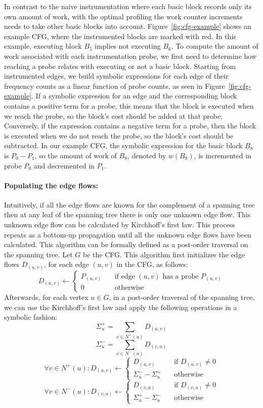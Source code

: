 In contrast to the naive instrumentation where each basic block records only its own amount of work, with the optimal profiling the work
counter increments needs to take other basic blocks into account. Figure~\ref{fig:cfg-example} shows an example CFG, where the instrumented
blocks are marked with red. In this example, executing block $B_5$ implies not executing $B_6$. To compute the amount of work associated
with each instrumentation probe, we first need to determine how reaching a probe relates with executing or not a basic block. Starting from
instrumented edges, we build symbolic expressions for each edge of their frequency counts as a linear function of probe counts, as seen in
Figure~\ref{fig:cfg-example}. If a symbolic expression for an edge and the corresponding block contains a positive term for a probe, this
means that the block is executed when we reach the probe, so the block's cost should be added at that probe. Conversely, if the expression
contains a negative term for a probe, then the block is executed when we do not reach the probe, so the block's cost should be subtracted.
In our example CFG, the symbolic expression for the basic block $B_8$ is $P_0 - P_1$, so the amount of work of $B_8$, denoted by $w(B_8)$,
is incremented in probe $P_0$ and decremented in $P_1$.

\paragraph{Populating the edge flows:}
Intuitively, if all the edge flows are known for the complement of a spanning tree then at any leaf of the spanning tree there is only one
unknown edge flow. This unknown edge flow can be calculated by Kirchhoff's first law\cite{knuth73,ball94}. This process repeats as a bottom-up
propagation until all the unknown edge flows have been calculated. This algorithm can be formally defined as a post-order traversal on the
spanning tree. Let $G$ be the CFG. This algorithm first initializes the edge flows $D_{(u,v)}$, for each edge $(u,v)$ in the CFG, as
follows:
\[
D_{(u,v)} \gets
\begin{cases}
    P_{(u,v)} & \quad \text{if edge $(u,v)$ has a probe $P_{(u,v)}$}\\
    0       & \quad \text{otherwise}
\end{cases}
\]
Afterwards, for each vertex $u\in G$, in a post-order traversal of the spanning tree,
we can use the Kirchhoff's first law and apply the following operations
in a symbolic fashion:
\[
\Sigma^+_u = \sum_{v\in N^+(u)} D_{(u,v)}
\]
\[
\Sigma^-_u = \sum_{v\in N^-(u)} D_{(v,u)}
\]
\[
\forall v\in N^+(u):  D_{(u,v)} \gets
\begin{cases}
    D_{(u,v)} & \quad \text{if $D_{(u,v)}\neq 0$}\\
    \Sigma^-_u - \Sigma^+_u       & \quad \text{otherwise}
\end{cases}
\]
\[
\forall v\in N^-(u):  D_{(v,u)} \gets
\begin{cases}
    D_{(v,u)} & \quad \text{if $D_{(v,u)}\neq 0$}\\
    \Sigma^+_u - \Sigma^-_u       & \quad \text{otherwise}
\end{cases}
\]

